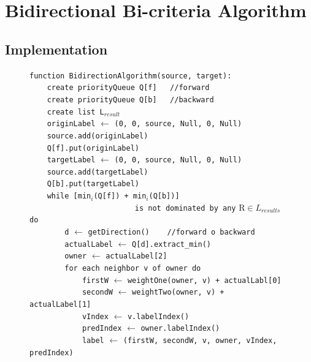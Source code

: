 \documentclass[a4paper,11pt]{report}
\begin{document}
\section{Bidirectional Bi-criteria Algorithm}
\subsection{Implementation}
\begin{figure}[H]
	\verb|function BidirectionAlgorithm(source, target):|\\
	\verb|    create priorityQueue Q[f]   //forward|\\
	\verb|    create priorityQueue Q[b]   //backward|\\
	\verb|    create list L|$_{result}$\\
	\verb|    originLabel| $\leftarrow$ \verb|(0, 0, source, Null, 0, Null)|\\
	\verb|    source.add(originLabel)|\\
	\verb|    Q[f].put(originLabel)|\\
	\verb|    targetLabel| $\leftarrow$ \verb|(0, 0, source, Null, 0, Null)|\\
	\verb|    source.add(targetLabel)|\\
	\verb|    Q[b].put(targetLabel)|\\
	\verb|    while [min|$_i$\verb|(Q[f]) + min|$_i$\verb|(Q[b])]|\\\verb|                        is not dominated by any| R$\in L_{results}$ \verb|do|\\
	\verb|        d| $\leftarrow$ \verb|getDirection()    //forward o backward|\\
	\verb|        actualLabel| $\leftarrow$ \verb|Q[d].extract_min()|\\
	\verb|        owner| $\leftarrow$ \verb|actualLabel[2]|\\
	\verb|        for each neighbor v of owner do|\\
	\verb|            firstW| $\leftarrow$ \verb|weightOne(owner, v) + actualLabl[0]|\\
	\verb|            secondW| $\leftarrow$ \verb|weightTwo(owner, v) + actualLabel[1]|\\
	\verb|            vIndex| $\leftarrow$ \verb|v.labelIndex()|\\
	\verb|            predIndex| $\leftarrow$ \verb|owner.labelIndex()|\\
	\verb|            label| $\leftarrow$ \verb|(firstW, secondW, v, owner, vIndex, predIndex)|\\

\end{figure}
\end{document}

